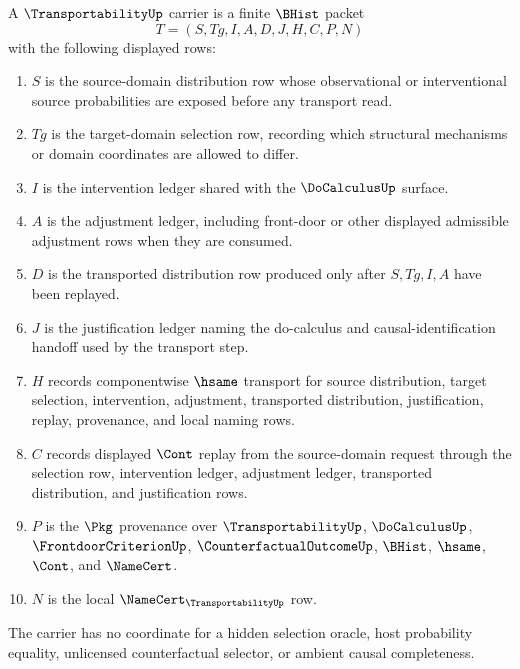 \begin{definition}
\label{def:transportability-carrier}
A $\TransportabilityUp$ carrier is a finite $\BHist$ packet
$$
T=(S,Tg,I,A,D,J,H,C,P,N)
$$
with the following displayed rows:
\begin{enumerate}
\item $S$ is the source-domain distribution row whose observational or interventional source probabilities are exposed before any transport read.
\item $Tg$ is the target-domain selection row, recording which structural mechanisms or domain coordinates are allowed to differ.
\item $I$ is the intervention ledger shared with the $\DoCalculusUp$ surface.
\item $A$ is the adjustment ledger, including front-door or other displayed admissible adjustment rows when they are consumed.
\item $D$ is the transported distribution row produced only after $S,Tg,I,A$ have been replayed.
\item $J$ is the justification ledger naming the do-calculus and causal-identification handoff used by the transport step.
\item $H$ records componentwise $\hsame$ transport for source distribution, target selection, intervention, adjustment, transported distribution, justification, replay, provenance, and local naming rows.
\item $C$ records displayed $\Cont$ replay from the source-domain request through the selection row, intervention ledger, adjustment ledger, transported distribution, and justification rows.
\item $P$ is the $\Pkg$ provenance over $\TransportabilityUp$, $\DoCalculusUp$, $\FrontdoorCriterionUp$, $\CounterfactualOutcomeUp$, $\BHist$, $\hsame$, $\Cont$, and $\NameCert$.
\item $N$ is the local $\NameCert_{\TransportabilityUp}$ row.
\end{enumerate}
The carrier has no coordinate for a hidden selection oracle, host probability equality, unlicensed counterfactual selector, or ambient causal completeness.
\end{definition}

